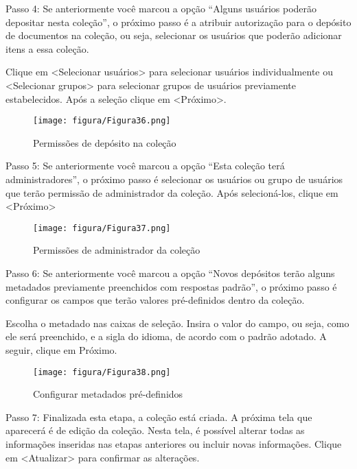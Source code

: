 \documentclass[12pt,hidelinks]{article}
\begin{document}
    Passo 4: Se anteriormente você marcou a opção “Alguns usuários poderão depositar nesta coleção”, o próximo passo é a atribuir autorização para o depósito de documentos na coleção, ou seja, selecionar os usuários que poderão adicionar itens a essa coleção.
    
    Clique em <Selecionar usuários> para selecionar usuários individualmente ou <Selecionar grupos> para selecionar grupos de usuários previamente estabelecidos. Após a seleção clique em <Próximo>.
    
    \begin{figure}[!htp]
                \centering
                \texttt{[image: figura/Figura36.png]}
                \caption{Permissões de depósito na coleção}
            \label{Rotulo}
        \end{figure}

\newpage

    Passo 5: Se anteriormente você marcou a opção “Esta coleção terá administradores”, o próximo passo é selecionar os usuários ou grupo de usuários que terão permissão de administrador da coleção. Após selecioná-los, clique em <Próximo>
    
    \begin{figure}[!htp]
                \centering
                \texttt{[image: figura/Figura37.png]}
                \caption{Permissões de administrador da coleção}
            \label{Rotulo}
        \end{figure}
    
    Passo 6: Se anteriormente você marcou a opção “Novos depósitos terão alguns metadados previamente preenchidos com respostas padrão”, o próximo passo é configurar os campos que terão valores pré-definidos dentro da coleção.
    
    \singlespacing
    
    Escolha o metadado nas caixas de seleção. Insira o valor do campo, ou seja, como ele será preenchido, e a sigla do idioma, de acordo com o padrão adotado. A seguir, clique em Próximo.
    
    \begin{figure}[!htp]
                \centering
                \texttt{[image: figura/Figura38.png]}
                \caption{Configurar metadados pré-definidos}
            \label{Rotulo}
        \end{figure}
        
\newpage

    Passo 7: Finalizada esta etapa, a coleção está criada. A próxima tela que aparecerá é de edição
    da coleção. Nesta tela, é possível alterar todas as informações inseridas nas etapas anteriores ou incluir novas informações. Clique em <Atualizar> para confirmar as alterações.
    
\end{document}
